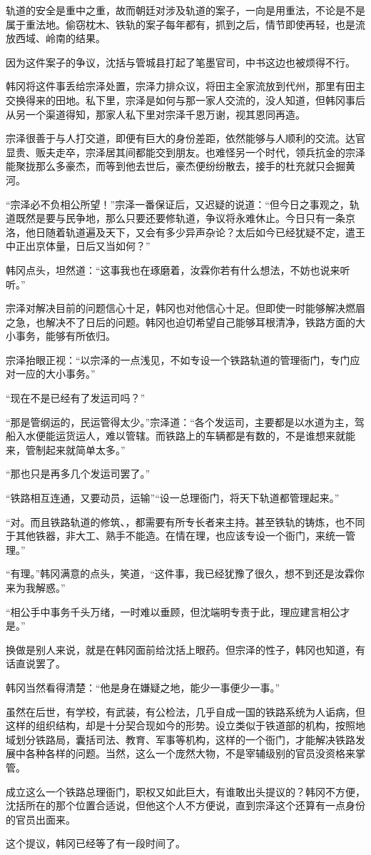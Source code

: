 轨道的安全是重中之重，故而朝廷对涉及轨道的案子，一向是用重法，不论是不是属于重法地。偷窃枕木、铁轨的案子每年都有，抓到之后，情节即使再轻，也是流放西域、岭南的结果。

因为这件案子的争议，沈括与管城县打起了笔墨官司，中书这边也被烦得不行。

韩冈将这件事丢给宗泽处置，宗泽力排众议，将田主全家流放到代州，那里有田主交换得来的田地。私下里，宗泽是如何与那一家人交流的，没人知道，但韩冈事后从另一个渠道得知，那家人私下里对宗泽千恩万谢，视其恩同再造。

宗泽很善于与人打交道，即便有巨大的身份差距，依然能够与人顺利的交流。达官显贵、贩夫走卒，宗泽居其间都能交到朋友。也难怪另一个时代，领兵抗金的宗泽能聚拢那么多豪杰，而等到他去世后，豪杰便纷纷散去，接手的杜充就只会掘黄河。

“宗泽必不负相公所望！”宗泽一番保证后，又迟疑的说道：“但今日之事观之，轨道既然是要与民争地，那么只要还要修轨道，争议将永难休止。今日只有一条京洛，他日随着轨道遍及天下，又会有多少异声杂论？太后如今已经犹疑不定，遣王中正出京体量，日后又当如何？”

韩冈点头，坦然道：“这事我也在琢磨着，汝霖你若有什么想法，不妨也说来听听。”

宗泽对解决目前的问题信心十足，韩冈也对他信心十足。但即使一时能够解决燃眉之急，也解决不了日后的问题。韩冈也迫切希望自己能够耳根清净，铁路方面的大小事务，能够有所依归。

宗泽抬眼正视：“以宗泽的一点浅见，不如专设一个铁路轨道的管理衙门，专门应对一应的大小事务。”

“现在不是已经有了发运司吗？”

“那是管纲运的，民运管得太少。”宗泽道：“各个发运司，主要都是以水道为主，驾船入水便能运货运人，难以管辖。而铁路上的车辆都是有数的，不是谁想来就能来，管制起来就简单太多。”

“那也只是再多几个发运司罢了。”

“铁路相互连通，又要动员，运输”“设一总理衙门，将天下轨道都管理起来。”

“对。而且铁路轨道的修筑、，都需要有所专长者来主持。甚至铁轨的铸炼，也不同于其他铁器，非大工、熟手不能造。在情在理，也应该专设一个衙门，来统一管理。”

“有理。”韩冈满意的点头，笑道，“这件事，我已经犹豫了很久，想不到还是汝霖你来为我解惑。”

“相公手中事务千头万绪，一时难以垂顾，但沈端明专责于此，理应建言相公才是。”

换做是别人来说，就是在韩冈面前给沈括上眼药。但宗泽的性子，韩冈也知道，有话直说罢了。

韩冈当然看得清楚：“他是身在嫌疑之地，能少一事便少一事。”

虽然在后世，有学校，有武装，有公检法，几乎自成一国的铁路系统为人诟病，但这样的组织结构，却是十分契合现如今的形势。设立类似于铁道部的机构，按照地域划分铁路局，囊括司法、教育、军事等机构，这样的一个衙门，才能解决铁路发展中各种各样的问题。当然，这么一个庞然大物，不是宰辅级别的官员没资格来掌管。

成立这么一个铁路总理衙门，职权又如此巨大，有谁敢出头提议的？韩冈不方便，沈括所在的那个位置合适说，但他这个人不方便说，直到宗泽这个还算有一点身份的官员出面来。

这个提议，韩冈已经等了有一段时间了。
